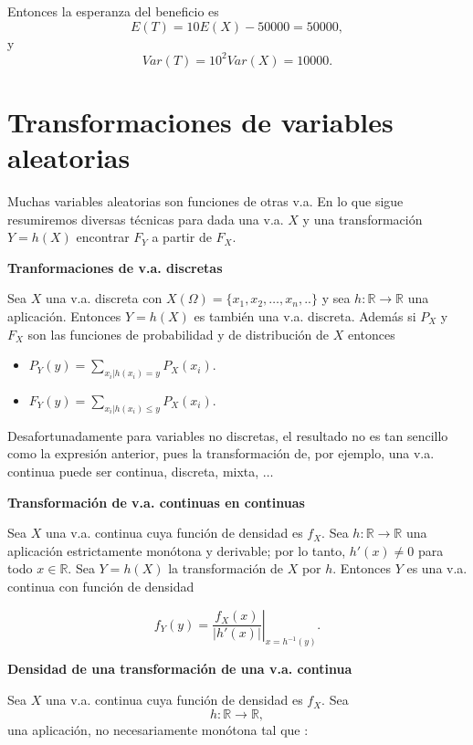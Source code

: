 \documentclass[]{book}
\providecommand{\tightlist}{%
  \setlength{\itemsep}{0pt}\setlength{\parskip}{0pt}}
\begin{document}
Entonces la esperanza del beneficio es
\[E(T)=10 E(X)-50000 = 50000,\]
y
\[Var(T)=10^2 Var(X)= 10000.\]

\hypertarget{transformaciones-de-variables-aleatorias}{%
\section{Transformaciones de variables aleatorias}\label{transformaciones-de-variables-aleatorias}}

Muchas variables aleatorias son funciones de otras v.a. En lo que sigue resumiremos diversas técnicas para dada una v.a. \(X\) y una
transformación \(Y=h(X)\) encontrar \(F_{Y}\) a
partir de \(F_{X}\).

\textbf{Tranformaciones de v.a. discretas}

Sea \(X\) una v.a. discreta con \(X(\Omega)=\{x_1,x_2,\ldots,x_{n},..\}\) y sea \(h:\mathbb{R}\to\mathbb{R}\) una aplicación.
Entonces \(Y=h(X)\) es también una v.a. discreta. Además si \(P_X\)
y \(F_{X}\) son las funciones de probabilidad y de distribución de
\(X\) entonces

\begin{itemize}
\tightlist
\item
  \(\displaystyle P_{Y}(y)=\sum_{x_{i}|h(x_{i})=y}P_X(x_{i}).\)
\item
  \(\displaystyle F_{Y}(y)=\sum_{x_{i}|h(x_{i})\leq y} P_X(x_{i}).\)
\end{itemize}

Desafortunadamente para variables no discretas, el resultado no es tan sencillo como la expresión anterior, pues la transformación de, por ejemplo, una v.a. continua puede ser continua, discreta, mixta, \(\ldots\)

\textbf{Transformación de v.a. continuas en continuas}

Sea \(X\) una v.a. continua cuya función de densidad es \(f_{X}\). Sea
\(h:\mathbb{R}\to\mathbb{R}\) una aplicación estrictamente monótona y derivable; por lo tanto, \(h'(x)\not=0\) para todo \(x\in\mathbb{R}\). Sea \(Y=h(X)\) la transformación de \(X\) por \(h\). Entonces \(Y\) es una v.a. continua con función de densidad

\[f_{Y}(y)=\left.\frac{f_{X}(x)}
{\left|h'(x)\right|}\right|_{x=h^{-1}(y)}.\]

\textbf{Densidad de una transformación de una v.a. continua}

Sea \(X\) una v.a. continua cuya función de densidad es \(f_{X}\). Sea
\[h:\mathbb{R}\to\mathbb{R},\]
una aplicación, no necesariamente monótona tal que :
\end{document}
